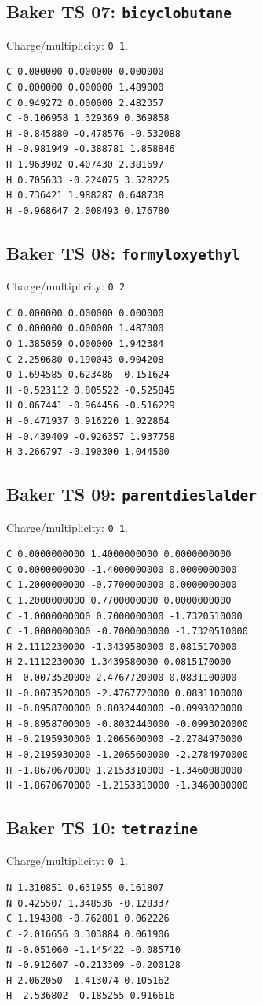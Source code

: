 \documentclass[10pt]{article}
\begin{document}
{\subsection*{Baker TS 07: \texttt{bicyclobutane}}
Charge/multiplicity: \texttt{0 1}.
\begin{verbatim}
C 0.000000 0.000000 0.000000
C 0.000000 0.000000 1.489000
C 0.949272 0.000000 2.482357
C -0.106958 1.329369 0.369858
H -0.845880 -0.478576 -0.532088
H -0.981949 -0.388781 1.858846
H 1.963902 0.407430 2.381697
H 0.705633 -0.224075 3.528225
H 0.736421 1.988287 0.648738
H -0.968647 2.008493 0.176780
\end{verbatim}
\subsection*{Baker TS 08: \texttt{formyloxyethyl}}
Charge/multiplicity: \texttt{0 2}.
\begin{verbatim}
C 0.000000 0.000000 0.000000
C 0.000000 0.000000 1.487000
O 1.385059 0.000000 1.942384
C 2.250680 0.190043 0.904208
O 1.694585 0.623486 -0.151624
H -0.523112 0.805522 -0.525845
H 0.067441 -0.964456 -0.516229
H -0.471937 0.916220 1.922864
H -0.439409 -0.926357 1.937758
H 3.266797 -0.190300 1.044500
\end{verbatim}
\subsection*{Baker TS 09: \texttt{parentdieslalder}}
Charge/multiplicity: \texttt{0 1}.
\begin{verbatim}
C 0.0000000000 1.4000000000 0.0000000000
C 0.0000000000 -1.4000000000 0.0000000000
C 1.2000000000 -0.7700000000 0.0000000000
C 1.2000000000 0.7700000000 0.0000000000
C -1.0000000000 0.7000000000 -1.7320510000
C -1.0000000000 -0.7000000000 -1.7320510000
H 2.1112230000 -1.3439580000 0.0815170000
H 2.1112230000 1.3439580000 0.0815170000
H -0.0073520000 2.4767720000 0.0831100000
H -0.0073520000 -2.4767720000 0.0831100000
H -0.8958700000 0.8032440000 -0.0993020000
H -0.8958700000 -0.8032440000 -0.0993020000
H -0.2195930000 1.2065600000 -2.2784970000
H -0.2195930000 -1.2065600000 -2.2784970000
H -1.8670670000 1.2153310000 -1.3460080000
H -1.8670670000 -1.2153310000 -1.3460080000
\end{verbatim}
\subsection*{Baker TS 10: \texttt{tetrazine}}
Charge/multiplicity: \texttt{0 1}.
\begin{verbatim}
N 1.310851 0.631955 0.161807
N 0.425507 1.348536 -0.128337
C 1.194308 -0.762881 0.062226
C -2.016656 0.303884 0.061906
N -0.051060 -1.145422 -0.085710
N -0.912607 -0.213309 -0.200128
H 2.062050 -1.413074 0.105162
H -2.536802 -0.185255 0.916616
\end{verbatim}
}
\end{document}
